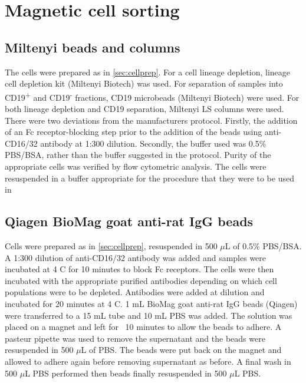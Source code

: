 \section{Magnetic cell sorting}
\label{Methods:MACSdepletion}

\subsection{Miltenyi beads and columns}
\label{subsec:Miltenyibeads}

The cells were prepared as in \cref{sec:cellprep}.
For a cell lineage depletion, lineage cell depletion kit (Miltenyi Biotech) was used.
For separation of samples into CD19\textsuperscript{+} and CD19\textsuperscript{-} fractions, CD19 microbeads (Miltenyi Biotech) were used.
For both lineage depletion and CD19 separation, Miltenyi LS columns were used. %
There were two deviations from the manufacturers protocol.
Firstly, the addition of an Fc receptor-blocking step prior to the addition of the beads using anti-CD16/32 antibody at 1:300 dilution.
Secondly, the buffer used was 0.5\% PBS/BSA, rather than the buffer suggested in the protocol.
Purity of the appropriate cells was verified by flow cytometric analysis.
The cells were resuspended in a buffer appropriate for the procedure that they were to be used in

\subsection{Qiagen BioMag goat anti-rat IgG beads}

Cells were prepared as in \cref{sec:cellprep}, resuspended in 500 $\mu$L of 0.5\% PBS/BSA.
A 1:300 dilution of anti-CD16/32 antibody was added and samples were incubated at 4 \textdegree C for 10 minutes to block Fc receptors.
The cells were then incubated with the appropriate purified antibodies depending on which cell populations were to be depleted.
Antibodies were added at  dilution and incubated for 20 minutes at 4 \textdegree C.
1 mL  BioMag goat anti-rat IgG beads (Qiagen) were transferred to a 15 mL tube and 10 mL PBS was added.
The solution was placed on a magnet and left for ~10 minutes to allow the beads to adhere.
A pasteur pipette was used to remove the supernatant and the beads were resuspended in 500 $\mu$L of PBS.
The beads were put back on the magnet and allowed to adhere again before removing supernatant as before.
A final wash in 500 $\mu$L PBS performed then beads finally resuspended in 500 $\mu$L PBS.

